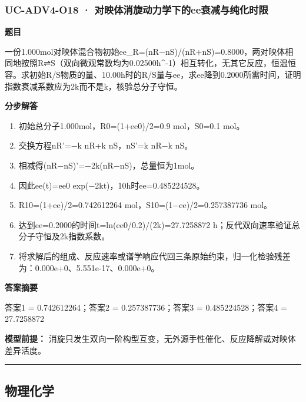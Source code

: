 \documentclass[UTF8,11pt,a4paper]{ctexart}
\begin{document}
\subsubsection*{UC-ADV4-O18 · 对映体消旋动力学下的ee衰减与纯化时限}
\noindent\textbf{题目}\par
一份1.000mol对映体混合物初始ee\_R=(nR−nS)/(nR+nS)=0.8000，两对映体相同地按照R⇌S（双向微观常数均为0.02500h\textasciicircum{}-1）相互转化，无其它反应，恒温恒容。求初始R/S物质的量、10.00h时的R/S量与ee，求ee降到0.2000所需时间，证明指数衰减系数应为2k而不是k，核验总分子守恒。\par
\medskip\noindent\textbf{分步解答}
\begin{enumerate}
\item 初始总分子1.000mol，R0=(1+ee0)/2=0.9 mol，S0=0.1 mol。
\item 交换方程nR'=−k nR+k nS，nS'=k nR−k nS。
\item 相减得(nR−nS)'=−2k(nR−nS)，总量恒为1mol。
\item 因此ee(t)=ee0 exp(−2kt)，10h时ee=0.485224528。
\item R10=(1+ee)/2=0.742612264 mol，S10=(1−ee)/2=0.257387736 mol。
\item 达到ee=0.2000的时间t=ln(ee0/0.2)/(2k)=27.7258872 h；反代双向速率验证总分子守恒及2k指数系数。
\item 将求解后的组成、反应速率或谱学响应代回三条原始约束，归一化检验残差为：0.000e+0、5.551e-17、0.000e+0。
\end{enumerate}
\noindent\textbf{答案摘要}\par
答案1 = 0.742612264；答案2 = 0.257387736；答案3 = 0.485224528；答案4 = 27.7258872\par
\noindent\textbf{模型前提：}
消旋只发生双向一阶构型互变，无外源手性催化、反应降解或对映体差异活度。\par
\medskip\hrule\medskip
\subsection*{物理化学}
\end{document}
